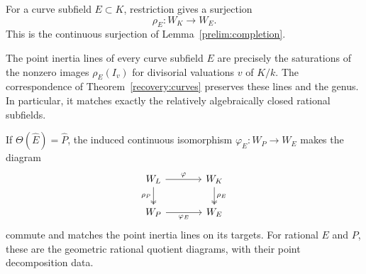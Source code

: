 For a curve subfield $E\subset K$, restriction gives a surjection
\[
 \rho_E:W_K\longrightarrow W_E.
\]
This is the continuous surjection of Lemma~\ref{prelim:completion}.

\begin{proposition}\label{recovery:rational}
The point inertia lines of every curve subfield $E$ are precisely
the saturations of the nonzero images $\rho_E(I_v)$ for divisorial
valuations $v$ of $K/k$. The correspondence of
Theorem~\ref{recovery:curves} preserves these lines and the genus.
In particular, it matches exactly the relatively algebraically closed
rational subfields.

If $\Theta(\widehat E)=\widehat P$, the induced continuous
isomorphism $\varphi_E:W_P\to W_E$ makes the diagram
\begin{equation}\label{eq:recovery-quotient-diagram}
\begin{tikzcd}[column sep=large]
 W_L \arrow[r,"\varphi"] \arrow[d,two heads,"\rho_P"']
   & W_K \arrow[d,two heads,"\rho_E"] \\
 W_P \arrow[r,"\varphi_E"'] & W_E
\end{tikzcd}
\end{equation}
commute and matches the point inertia lines on its targets.
For rational $E$ and $P$, these are the geometric rational quotient
diagrams, with their point decomposition data.
\end{proposition}

